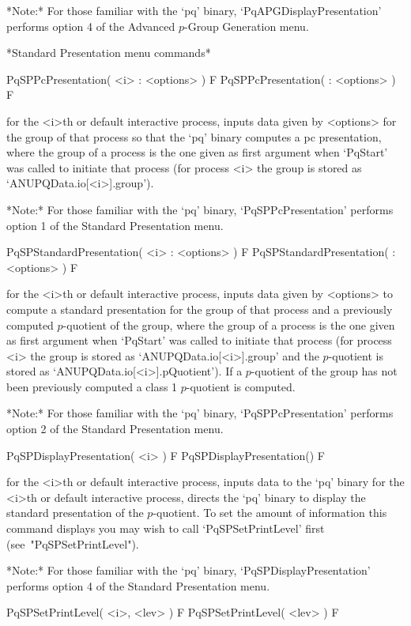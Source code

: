 *Note:*
For those  familiar  with  the  `pq'  binary,  `PqAPGDisplayPresentation'
performs option 4 of the Advanced $p$-Group Generation menu.

*Standard Presentation menu commands*

\>PqSPPcPresentation( <i> : <options> ) F
\>PqSPPcPresentation( : <options> ) F

for the <i>th or default interactive {\ANUPQ} process, inputs data  given
by <options> for the group of  that  process  so  that  the  `pq'  binary
computes a pc presentation, where the group of a process is the one given
as first argument when `PqStart' was called to initiate that process (for
process <i> the group is stored as `ANUPQData.io[<i>].group').

*Note:* For those familiar with  the  `pq'  binary,  `PqSPPcPresentation'
performs option 1 of the Standard Presentation menu.

\>PqSPStandardPresentation( <i> : <options> ) F
\>PqSPStandardPresentation( : <options> ) F

for the <i>th or default interactive {\ANUPQ} process, inputs data  given
by <options> to compute a standard presentation for  the  group  of  that
process and a previously computed $p$-quotient of the  group,  where  the
group of a process is the one given as first argument when `PqStart'  was
called to initiate that process (for process <i> the group is  stored  as
`ANUPQData.io[<i>].group'   and   the   $p$-quotient   is    stored    as
`ANUPQData.io[<i>].pQuotient'). If a $p$-quotient of the  group  has  not
been previously computed a class 1 $p$-quotient is computed.

*Note:* For those familiar with  the  `pq'  binary,  `PqSPPcPresentation'
performs option 2 of the Standard Presentation menu.

\>PqSPDisplayPresentation( <i> ) F
\>PqSPDisplayPresentation() F

for the <i>th or default interactive {\ANUPQ} process, inputs data to the
`pq' binary for  the  <i>th  or  default  interactive  {\ANUPQ}  process,
directs the `pq' binary to  display  the  standard  presentation  of  the
$p$-quotient. To set the amount of information this command displays  you
may wish to call `PqSPSetPrintLevel' first (see~"PqSPSetPrintLevel").

*Note:*
For  those  familiar  with  the  `pq'  binary,  `PqSPDisplayPresentation'
performs option 4 of the Standard Presentation menu.

\>PqSPSetPrintLevel( <i>, <lev> ) F
\>PqSPSetPrintLevel( <lev> ) F

